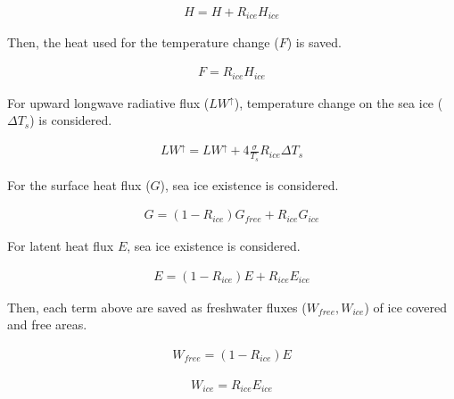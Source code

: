 \begin{eqnarray}
    H=H+ R_{ice}  H_{ice}
\end{eqnarray}

Then, the heat used for the temperature change (\(F\)) is saved.

\begin{eqnarray}
    F = R_{ice} H_{ice}
\end{eqnarray}

For upward longwave radiative flux (\(LW^\uparrow\)), temperature change
on the sea ice (\(\Delta T_s\)) is considered.

\begin{eqnarray}
    LW^\uparrow=LW^\uparrow +  4\frac{\sigma}{T_s}R_{ice}  \Delta T_s
\end{eqnarray}

For the surface heat flux (\(G\)), sea ice existence is considered.

\begin{eqnarray}
    G=(1-R_{ice})G_{free} + R_{ice}G_{ice}
\end{eqnarray}

For latent heat flux \(E\), sea ice existence is considered.

\begin{eqnarray}
    E=(1-R_{ice})E + R_{ice}E_{ice}
\end{eqnarray}

Then, each term above are saved as freshwater fluxes
(\(W_{free}, W_{ice}\)) of ice covered and free areas.

\begin{eqnarray}
    W_{free} = (1-R_{ice}) E
\end{eqnarray}

\begin{eqnarray}
    W_{ice} = R_{ice} E_{ice}
\end{eqnarray}
